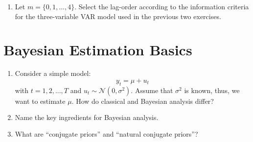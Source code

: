 \documentclass[a4paper]{scrartcl}
\begin{document}
\begin{enumerate}
\begin{solution}
              \end{solution}
        \item Let $m=\{0,1,...,4\}$. Select the lag-order according to the information criteria for the three-variable VAR model used in the previous two exercises.
              \begin{solution}
              \end{solution}
    \end{enumerate}
    
    \section{Bayesian Estimation Basics}
    \begin{enumerate}
        \item Consider a simple model:
              $$y_t = \mu + u_t$$
              with $t = 1, 2,..., T$ and $u_t \sim \mathcal{N}(0,\sigma^2)$. Assume that $\sigma^2$ is known, thus, we want to estimate $\mu$. How do classical and Bayesian analysis differ?
        \item Name the key ingredients for Bayesian analysis.
        \item What are \enquote{conjugate priors} and \enquote{natural conjugate priors}?
              
    \end{enumerate}
    \newpage
\end{document}
